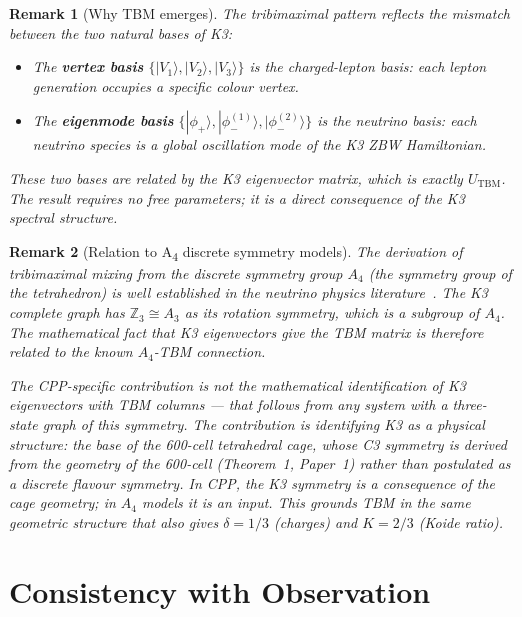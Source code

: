 \documentclass[11pt]{article}
\newtheorem{remark}{Remark}[section]
\newcommand{\TBM}{\mathrm{TBM}}
\begin{document}
\begin{remark}[Why TBM emerges]
The tribimaximal pattern reflects the \emph{mismatch} between the
two natural bases of K3:
\begin{itemize}
\item The \textbf{vertex basis} $\{|V_1\rangle, |V_2\rangle, |V_3\rangle\}$
  is the charged-lepton basis: each lepton generation occupies a
  specific colour vertex.
\item The \textbf{eigenmode basis} $\{|\phi_+\rangle, |\phi_-^{(1)}\rangle,
  |\phi_-^{(2)}\rangle\}$ is the neutrino basis: each neutrino species
  is a global oscillation mode of the K3 ZBW Hamiltonian.
\end{itemize}
These two bases are related by the K3 eigenvector matrix, which is
exactly $U_\TBM$.  The result requires no free parameters; it is a
direct consequence of the K3 spectral structure.
\end{remark}


\begin{remark}[Relation to A\textsubscript{4} discrete symmetry models]
The derivation of tribimaximal mixing from the discrete symmetry group
$A_4$ (the symmetry group of the tetrahedron) is well established in
the neutrino physics literature~\cite{Harrison2002,Ma2001,AltarelliFerruglio2010}.
The K3 complete graph has $\mathbb{Z}_3 \cong A_3$ as its rotation
symmetry, which is a subgroup of $A_4$.  The mathematical fact that
K3 eigenvectors give the TBM matrix is therefore related to the known
$A_4$-TBM connection.

The \emph{CPP-specific contribution} is not the mathematical
identification of K3 eigenvectors with TBM columns --- that follows
from any system with a three-state graph of this symmetry.  The
contribution is identifying K3 as a \emph{physical structure}: the
base of the 600-cell tetrahedral cage, whose C3 symmetry is derived
from the geometry of the 600-cell (Theorem~1, Paper~1) rather than
postulated as a discrete flavour symmetry.  In CPP, the K3 symmetry
is a consequence of the cage geometry; in $A_4$ models it is an input.
This grounds TBM in the same geometric structure that also gives
$\delta = 1/3$ (charges) and $K = 2/3$ (Koide ratio).
\end{remark}

\section{Consistency with Observation}
\end{document}
